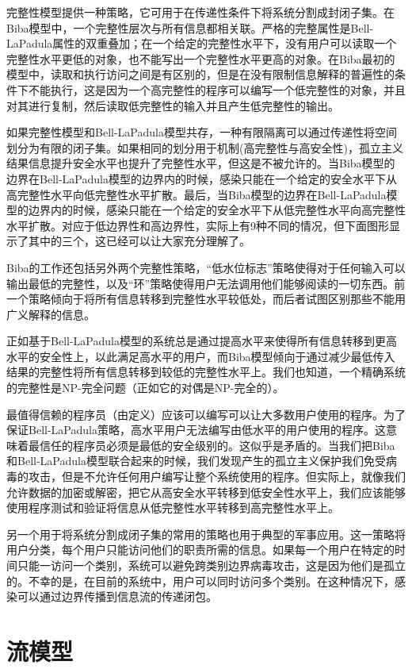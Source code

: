 完整性模型\cite{5}提供一种策略，它可用于在传递性条件下将系统分割成封闭子集。在Biba模型中，一个完整性层次与所有信息都相关联。严格的完整属性是Bell-LaPadula属性的双重叠加；在一个给定的完整性水平下，没有用户可以读取一个完整性水平更低的对象，也不能写出一个完整性水平更高的对象。在Biba最初的模型中，读取和执行访问之间是有区别的，但是在没有限制信息解释的普遍性的条件下不能执行，这是因为一个高完整性的程序可以编写一个低完整性的对象，并且对其进行复制，然后读取低完整性的输入并且产生低完整性的输出。


如果完整性模型和Bell-LaPadula模型共存，一种有限隔离可以通过传递性将空间划分为有限的闭子集。如果相同的划分用于机制(高完整性与高安全性)，孤立主义结果信息提升安全水平也提升了完整性水平，但这是不被允许的。当Biba模型的边界在Bell-LaPadula模型的边界内的时候，感染只能在一个给定的安全水平下从高完整性水平向低完整性水平扩散。最后，当Biba模型的边界在Bell-LaPadula模型的边界内的时候，感染只能在一个给定的安全水平下从低完整性水平向高完整性水平扩散。对应于低边界性和高边界性，实际上有9种不同的情况，但下面图形显示了其中的三个，这已经可以让大家充分理解了。


Biba的工作还包括另外两个完整性策略，“低水位标志”策略使得对于任何输入可以输出最低的完整性，以及“环”策略使得用户无法调用他们能够阅读的一切东西。前一个策略倾向于将所有信息转移到完整性水平较低处，而后者试图区别那些不能用广义解释的信息。


正如基于Bell-LaPadula模型的系统总是通过提高水平来使得所有信息转移到更高水平的安全性上，以此满足高水平的用户，而Biba模型倾向于通过减少最低传入结果的完整性将所有信息转移到较低的完整性水平上。我们也知道，一个精确系统的完整性是NP-完全问题（正如它的对偶是NP-完全的）。


最值得信赖的程序员（由定义）应该可以编写可以让大多数用户使用的程序。为了保证Bell-LaPadula策略，高水平用户无法编写由低水平的用户使用的程序。这意味着最信任的程序员必须是最低的安全级别的。这似乎是矛盾的。当我们把Biba和Bell-LaPadula模型联合起来的时候，我们发现产生的孤立主义保护我们免受病毒的攻击，但是不允许任何用户编写让整个系统使用的程序。但实际上，就像我们允许数据的加密或解密，把它从高安全水平转移到低安全性水平上，我们应该能够使用程序测试和验证将信息从低完整性水平转移到高完整性水平上。


另一个用于将系统分割成闭子集的常用的策略也用于典型的军事应用。这一策略将用户分类，每个用户只能访问他们的职责所需的信息。如果每一个用户在特定的时间只能一访问一个类别，系统可以避免跨类别边界病毒攻击，这是因为他们是孤立的。不幸的是，在目前的系统中，用户可以同时访问多个类别。在这种情况下，感染可以通过边界传播到信息流的传递闭包。


\section{流模型}


